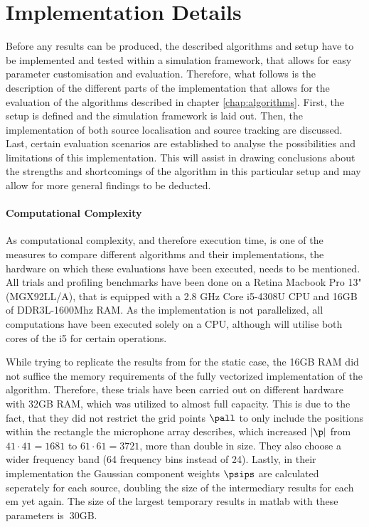 \section{Implementation Details}
\label{chap:implementation}

Before any results can be produced, the described algorithms and setup have to be implemented and tested within a simulation framework, that allows for easy parameter customisation and evaluation. Therefore, what follows is the description of the different parts of the implementation that allows for the evaluation of the algorithms described in chapter \ref{chap:algorithms}. First, the setup is defined and the simulation framework is laid out. Then, the implementation of both source localisation and source tracking are discussed. Last, certain evaluation scenarios are established to analyse the possibilities and limitations of this implementation. This will assist in drawing conclusions about the strengths and shortcomings of the algorithm in this particular setup and may allow for more general findings to be deducted.

\paragraph{Computational Complexity} As computational complexity, and therefore execution time, is one of the measures to compare different algorithms and their implementations, the hardware on which these evaluations have been executed, needs to be mentioned. All trials and profiling benchmarks have been done on a Retina Macbook Pro 13" (MGX92LL/A), that is equipped with a 2.8 GHz Core i5-4308U CPU and 16GB of DDR3L-1600Mhz RAM. As the implementation is not parallelized, all computations have been executed solely on a CPU, although \matlab will utilise both cores of the i5 for certain operations.

While trying to replicate the results from \cite{Schwartz2014} for the static case, the 16GB RAM did not suffice the memory requirements of the fully vectorized implementation of the algorithm. Therefore, these trials have been carried out on different hardware with 32GB RAM, which was utilized to almost full capacity. This is due to the fact, that they did not restrict the grid points $\pall$ to only include the positions within the rectangle the microphone array describes, which increased $|\p|$ from $41 \cdot 41 = 1681$ to $61\cdot61=3721$, more than double in size. They also choose a wider frequency band (64 frequency bins instead of 24). Lastly, in their implementation the Gaussian component weights $\psips$ are calculated seperately for each source, doubling the size of the intermediary results for each \gls{em} yet again. The size of the largest temporary results in matlab with these parameters is $~30$GB.
